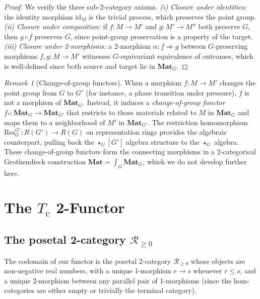 \documentclass[12pt,a4paper]{article}
\theoremstyle{plain}
\theoremstyle{definition}
\theoremstyle{remark}
\newtheorem{remark}[theorem]{Remark}
\newcommand{\Tc}{T_{\mathrm{c}}}
\newcommand{\Matl}{\mathbf{Mat}}
\newcommand{\MatlG}{\mathbf{Mat}_G}
\newcommand{\id}{\mathrm{id}}
\newcommand{\starG}{\star_G}
\begin{document}
\begin{proof}
We verify the three sub-2-category axioms.
\emph{(i) Closure under identities:} the identity morphism $\id_M$ is the
trivial process, which preserves the point group.
\emph{(ii) Closure under composition:} if $f \colon M \to M'$ and
$g \colon M' \to M''$ both preserve $G$, then $g \circ f$ preserves $G$,
since point-group preservation is a property of the target.
\emph{(iii) Closure under 2-morphisms:} a 2-morphism
$\alpha \colon f \Rightarrow g$ between $G$-preserving morphisms
$f, g \colon M \to M'$ witnesses $G$-equivariant equivalence of outcomes,
which is well-defined since both source and target lie in $\MatlG$.
\end{proof}

\begin{remark}[Change-of-group functors]\label{rem:change-of-group}
When a morphism $f \colon M \to M'$ changes the point group from $G$ to
$G'$ (for instance, a phase transition under pressure), $f$ is not a
morphism of $\MatlG$.  Instead, it induces a \emph{change-of-group functor}
$f_* \colon \MatlG \to \Matl_{G'}$ that restricts to those materials
related to $M$ in $\MatlG$ and maps them to a neighborhood of $M'$ in
$\Matl_{G'}$.  The restriction homomorphism
$\mathrm{Res}^{G'}_{G} \colon R(G') \to R(G)$ on representation rings
provides the algebraic counterpart, pulling back the $\starG[G']$ algebra
structure to the $\starG$ algebra.  These change-of-group functors form
the connecting morphisms in a 2-categorical Grothendieck construction
$\Matl = \int_G \MatlG$, which we do not develop further here.
\end{remark}


\section{The $\Tc$ 2-Functor}\label{sec:Tc-functor}

\subsection{The posetal 2-category $\mathscr{R}_{\geq 0}$}

The codomain of our functor is the posetal 2-category $\mathscr{R}_{\geq 0}$
whose objects are non-negative real numbers, with a unique 1-morphism
$r \to s$ whenever $r \leq s$, and a unique 2-morphism between any parallel
pair of 1-morphisms (since the hom-categories are either empty or trivially
the terminal category).
\end{document}
